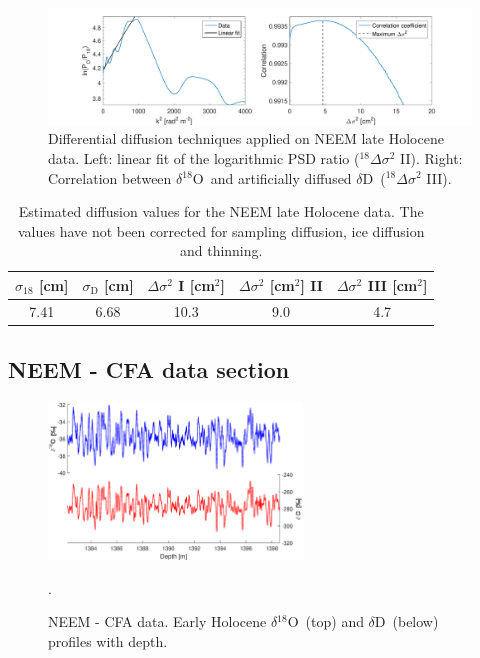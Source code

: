 \documentclass[11pt, draftcls, onecolumn]{IEEEtran} %
\numberwithin{equation}{section}
\numberwithin{table}{section}
\numberwithin{figure}{section}
\newcommand{\delOx}{$\delta{}^{18}\mathrm{O}$}
\newcommand{\delD}{$\delta\mathrm{D}$}
\begin{document}
\begin{appendices}
\begin{figure}[H]
	\vspace*{2mm}
	\begin{center}
		\includegraphics[width=1\textwidth]{Figure_17}
		\caption{Differential diffusion techniques applied on NEEM late Holocene data. 
				Left: linear fit of the logarithmic PSD ratio ($^{18}\Delta\sigma^2$ II). Right: 
				Correlation between \delOx~and artificially diffused \delD~($^{18}\Delta\sigma^2$ III).}  \label{fig:NEEM_late_fig_2}
	\end{center}
\end{figure}

\begin{table}[H]
	\center
	\caption{Estimated diffusion values for the NEEM late Holocene data.
			 The values have not been corrected for sampling diffusion, ice diffusion and thinning.}
	\label{NEEM_holo_tbl}
	\begin{tabular}{c c c c c} 
		\toprule
		$\sigma_{18}$ [cm] & $\sigma_\mathrm{D}$ [cm] & $\Delta\sigma^2$ I [cm$^2$] & $\Delta\sigma^2$ [cm$^2$] II & $\Delta\sigma^2$ III [cm$^2$] \\
		\midrule
		7.41 &   6.68 &    10.3 &     9.0 &     4.7 \\
		\bottomrule		
	\end{tabular}
\end{table}
\clearpage
\subsection{NEEM - CFA data section}

\begin{figure}[H]
	\vspace*{2mm}
	\begin{center}
		\includegraphics[width=0.6\textwidth]{NEEM_CFA_holo}
		\caption{NEEM - CFA data. Early Holocene \delOx~(top) and \delD~(below) profiles with depth.}  \label{fig:NEEM_CFA_holo}.
	\end{center}
\end{figure}


\end{appendices}
\end{document}
